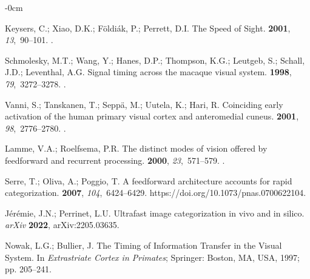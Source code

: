 \documentclass[brainsci, %
               review,accept,pdftex,moreauthors
               ]{Definitions/mdpi}
\begin{document}
\begin{adjustwidth}{-\extralength}{0cm}
\begin{thebibliography}{999}
Keysers, C.; Xiao, D.K.; Földiák, P.; Perrett, D.I.
\newblock The {Speed} of {Sight}.
 {\bf 2001}, {\em
  13},~90--101.\linebreak
{}.

Schmolesky, M.T.; Wang, Y.; Hanes, D.P.; Thompson, K.G.; Leutgeb, S.; Schall,
  J.D.; Leventhal, A.G.
\newblock Signal timing across the macaque visual system.
 {\bf 1998}, {\em 79},~3272--3278.
.

Vanni, S.; Tanskanen, T.; Seppä, M.; Uutela, K.; Hari, R.
\newblock Coinciding early activation of the human primary visual cortex and
  anteromedial cuneus.
 {\bf 2001}, {\em 98},~2776--2780.
.

Lamme, V.A.; Roelfsema, P.R.
\newblock The distinct modes of vision offered by feedforward and recurrent
  processing.
 {\bf 2000}, {\em 23},~571--579.
.

Serre, T.; Oliva, A.; Poggio, T.
\newblock A feedforward architecture accounts for rapid categorization.
 {\bf 2007}, {\em 104},~6424--6429.
  {{https://doi.org/10.1073/pnas.0700622104}}.

Jérémie, J.N.; Perrinet, L.U.
\newblock Ultrafast image categorization in vivo and in silico. \emph{arXiv}  \textbf{2022}, 
\newblock arXiv:2205.03635.

Nowak, L.G.; Bullier, J.
\newblock The {Timing} of {Information} {Transfer} in the {Visual} {System}. In
  {\em Extrastriate {Cortex} in {Primates}}; Springer: {Boston, MA, USA,} %
  1997; pp. 205--241.


\end{thebibliography}
\end{adjustwidth}
\end{document}
